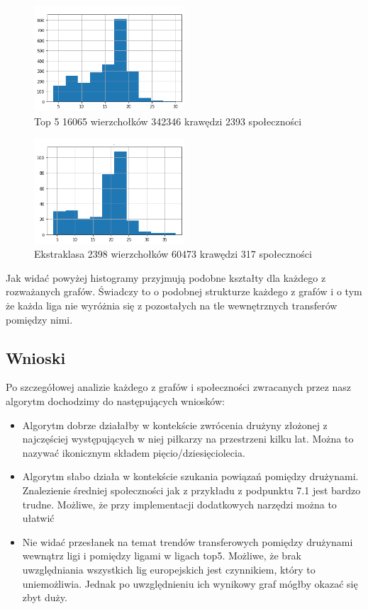 \documentclass{article}
\begin{document}
\begin{figure}[H]
    \centering
    \includegraphics[width=0.5\textwidth]{images/histtop5.png}
    \caption{Top 5 16065 wierzchołków 342346 krawędzi 2393 społeczności}
    \label{fig:my_label}
\end{figure}

\begin{figure}[H]
    \centering
    \includegraphics[width=0.5\textwidth]{images/heks.png}
    \caption{Ekstraklasa 2398 wierzchołków 60473 krawędzi 317 społeczności}
    \label{fig:my_label}
\end{figure}

Jak widać powyżej histogramy przyjmują podobne kształty dla każdego z rozważanych grafów. Świadczy to o podobnej strukturze każdego z grafów i o tym że każda liga nie wyróżnia się z pozostałych na tle wewnętrznych transferów pomiędzy nimi.

\subsection{Wnioski}
Po szczegółowej analizie każdego z grafów i społeczności zwracanych przez nasz algorytm dochodzimy do następujących wniosków:

\begin{itemize}
    \item Algorytm dobrze działałby w kontekście zwrócenia drużyny złożonej z najczęściej występujących w niej piłkarzy na przestrzeni kilku lat. Można to nazywać ikonicznym składem pięcio/dziesięciolecia.
    \item Algorytm słabo działa w kontekście szukania powiązań pomiędzy drużynami. Znalezienie średniej społeczności jak z przykładu z podpunktu 7.1 jest bardzo trudne. Możliwe, że przy implementacji dodatkowych narzędzi można to ułatwić
    \item Nie widać przesłanek na temat trendów transferowych pomiędzy drużynami wewnątrz ligi i pomiędzy ligami w ligach top5. Możliwe, że brak uwzględniania wszystkich lig europejskich jest czynnikiem, który to uniemożliwia. Jednak po uwzględnieniu ich wynikowy graf mógłby okazać się zbyt duży.
\end{itemize}
\end{document}
